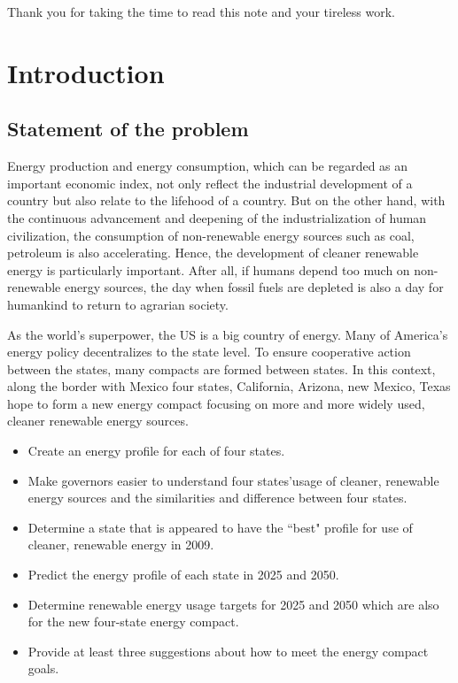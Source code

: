 \documentclass{mcmthesis}
\begin{document}
Thank you for taking the time to read this note and your tireless work.
\newpage
\tableofcontents
\newpage

\section{Introduction}
\subsection{Statement of the problem}
Energy production and energy consumption, which can be regarded as an important economic index, not only reflect the industrial development of a country but also relate to the lifehood of a country. But on the other hand, with the continuous advancement and deepening of the industrialization of human civilization, the consumption of non-renewable energy sources such as coal, petroleum is also accelerating. Hence, the development of cleaner renewable energy is particularly important. After all, if humans depend too much on non-renewable energy sources, the day when fossil fuels are depleted is also a day for humankind to return to agrarian society.

As the world's superpower, the US is a big country of energy. Many of America's energy policy decentralizes to the state level. To ensure cooperative action between the states\cite{InterstateCompact}, many compacts are formed between states. In this context, along the border with Mexico four states, California, Arizona, new Mexico, Texas hope to form a new energy compact focusing on more and more widely used, cleaner renewable energy sources.
\begin{itemize}
  \item Create an energy profile for each of four states.
  \item Make governors easier to understand four states'usage of cleaner, renewable energy sources  and the similarities and difference between four states.
  \item Determine a state that is appeared to have the ``best" profile for use of cleaner, renewable energy in 2009.
  \item Predict the energy profile of each state in 2025 and 2050.
  \item Determine renewable energy usage targets for 2025 and 2050 which are also for the new four-state energy compact.
  \item Provide at least three suggestions about how to meet the energy compact goals.
\end{itemize}
\end{document}
